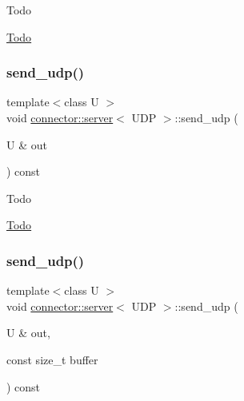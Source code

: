 \begin{DoxyRefDesc}{Todo}
\item[\hyperlink{todo__todo000015}{Todo}]\end{DoxyRefDesc}
\mbox{\label{classconnector_1_1server_3_01UDP_01_4_a404605c453a69e8faabf1aad3c3c606a}} 
\subsubsection{\texorpdfstring{send\+\_\+udp()}{send\_udp()}\hspace{0.1cm}{\footnotesize\ttfamily [1/2]}}
{\footnotesize\ttfamily template$<$class U $>$ \\
void \hyperlink{classconnector_1_1server}{connector\+::server}$<$ U\+DP $>$\+::send\+\_\+udp (\begin{DoxyParamCaption}\item[{U \&}]{out }\end{DoxyParamCaption}) const\hspace{0.3cm}{\ttfamily [inline]}}

\begin{DoxyRefDesc}{Todo}
\item[\hyperlink{todo__todo000016}{Todo}]\end{DoxyRefDesc}
\mbox{\label{classconnector_1_1server_3_01UDP_01_4_a9559c1ceb62c8c1ef79046b6f1646f8d}} 
\subsubsection{\texorpdfstring{send\+\_\+udp()}{send\_udp()}\hspace{0.1cm}{\footnotesize\ttfamily [2/2]}}
{\footnotesize\ttfamily template$<$class U $>$ \\
void \hyperlink{classconnector_1_1server}{connector\+::server}$<$ U\+DP $>$\+::send\+\_\+udp (\begin{DoxyParamCaption}\item[{U \&}]{out,  }\item[{const size\+\_\+t}]{buffer }\end{DoxyParamCaption}) const\hspace{0.3cm}{\ttfamily [inline]}}

